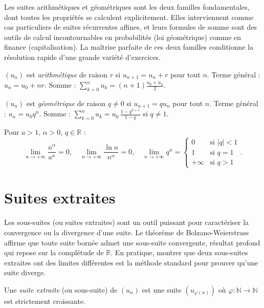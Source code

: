 \documentclass[11pt,a4paper,twoside]{book}
\newcommand{\N}{\mathbb{N}}
\newcommand{\R}{\mathbb{R}}
\begin{document}
Les suites arithmétiques et géométriques sont les deux familles fondamentales, dont toutes les propriétés se calculent explicitement. Elles interviennent comme cas particuliers de suites récurrentes affines, et leurs formules de somme sont des outils de calcul incontournables en probabilités (loi géométrique) comme en finance (capitalisation). La maîtrise parfaite de ces deux familles conditionne la résolution rapide d'une grande variété d'exercices.

\begin{definitionbox}
$(u_n)$ est \emph{arithmétique} de raison $r$ si $u_{n+1} = u_n + r$ pour tout $n$.
Terme général : $u_n = u_0 + nr$.
Somme : $\displaystyle\sum_{k=0}^{n} u_k = (n+1)\frac{u_0+u_n}{2}$.
\end{definitionbox}

\begin{definitionbox}
$(u_n)$ est \emph{géométrique} de raison $q \neq 0$ si $u_{n+1} = qu_n$ pour tout $n$.
Terme général : $u_n = u_0 q^n$.
Somme : $\displaystyle\sum_{k=0}^{n} u_k = u_0\,\frac{1-q^{n+1}}{1-q}$ si $q \neq 1$.
\end{definitionbox}

\begin{theoremebox}
Pour $a > 1$, $\alpha > 0$, $q \in \R$ :
\[
  \lim_{n\to+\infty} \frac{n^\alpha}{a^n} = 0, \quad
  \lim_{n\to+\infty} \frac{\ln n}{n^\alpha} = 0, \quad
  \lim_{n\to+\infty} q^n = \begin{cases} 0 & \text{si } |q|<1 \\ 1 & \text{si } q=1 \\ +\infty & \text{si } q>1 \end{cases}.
\]
\end{theoremebox}

\section{Suites extraites}

Les sous-suites (ou suites extraites) sont un outil puissant pour caractériser la convergence ou la divergence d'une suite. Le théorème de Bolzano-Weierstrass affirme que toute suite bornée admet une sous-suite convergente, résultat profond qui repose sur la complétude de $\mathbb{R}$. En pratique, montrer que deux sous-suites extraites ont des limites différentes est la méthode standard pour prouver qu'une suite diverge.

\begin{definitionbox}
Une \emph{suite extraite} (ou sous-suite) de $(u_n)$ est une suite $(u_{\varphi(n)})$ où
$\varphi : \N \to \N$ est strictement croissante.
\end{definitionbox}
\end{document}

